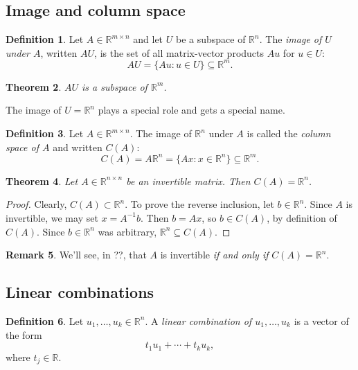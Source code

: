 \documentclass{amsart}
\newcommand{\RR}{\mathbb{R}}
\newtheorem{theorem}{Theorem}[section]
\theoremstyle{definition}
\newtheorem{definition}[theorem]{Definition}
\newtheorem{remark}[theorem]{Remark}
\begin{document}
\subsection{Image and column space}

\begin{definition}
  Let $A\in\RR^{m\times n}$ and let $U$ be a subspace of $\RR^n$.
The \emph{image of $U$ under $A$}, written $AU$, is the set of all matrix-vector products $Au$ for $u\in U$:
$$
AU = \{Au : u\in U\}\subseteq \RR^m.
$$
\end{definition}

\begin{theorem}
  $AU$ is a subspace of $\RR^m$.
\end{theorem}
 
The image of $U=\RR^n$ plays a special role and gets a special name.
\begin{definition}
  Let $A\in \RR^{m\times n}$. The image of $\RR^n$ under $A$ is called the \emph{column space of $A$} and written $C(A)$:
  $$
  C(A) = A\RR^n = \{Ax : x\in\RR^n\}\subseteq\RR^m.
  $$
\end{definition}

\begin{theorem}\label{theorem:col_space_of_invertible_matrix}
Let $A\in\RR^{n\times n}$ be an invertible matrix. Then $C(A)=\RR^n$.
\end{theorem}

\begin{proof}
Clearly, $C(A)\subset\RR^n$.
To prove the reverse inclusion, let $b\in\RR^n$. Since $A$ is invertible, we may set $x=A^{-1}b$. Then 
$b=Ax$, so $b\in C(A)$, by definition of $C(A)$. Since $b\in\RR^n$ was arbitrary, $\RR^n\subseteq C(A)$.
\end{proof}

\begin{remark}
We'll see, in ??, that $A$ is invertible \emph{if and only if} $C(A)=\RR^n$.
\end{remark}

\subsection{Linear combinations}

\begin{definition}
  Let $u_1,\ldots,u_k\in\RR^n$.
A \emph{linear combination of $u_1,\ldots,u_k$} is a vector of the form
$$t_1u_1+\cdots +t_ku_k,$$
where $t_j\in \RR$.
\end{definition}
\end{document}
